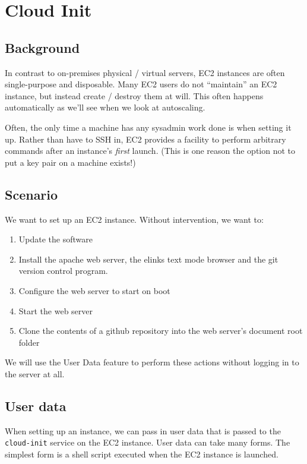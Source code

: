 \chapter{Cloud Init}
\label{ch:cloudinit}

\section{Background}\label{background}

In contrast to on-premises physical / virtual servers, EC2 instances are
often single-purpose and disposable. Many EC2 users do not ``maintain''
an EC2 instance, but instead create / destroy them at will. This often
happens automatically as we'll see when we look at autoscaling.

Often, the only time a machine has any sysadmin work done is when
setting it up. Rather than have to SSH in, EC2 provides a facility to
perform arbitrary commands after an instance's \emph{first} launch.
(This is one reason the option not to put a key pair on a machine
exists!)

\section{Scenario}\label{scenario}

We want to set up an EC2 instance. Without intervention, we want to:

\begin{enumerate}
\def\labelenumi{\arabic{enumi}.}
\item
  Update the software
\item
  Install the apache web server, the elinks text mode browser and the
  git version control program.
\item
  Configure the web server to start on boot
\item
  Start the web server
\item
  Clone the contents of a github repository into the web server's
  document root folder
\end{enumerate}

We will use the User Data feature to perform these actions without
logging in to the server at all.

\section{User data}\label{user-data}

When setting up an instance, we can pass in user data that is passed to
the \texttt{cloud-init} service on the EC2 instance. User data can take
many forms. The simplest form is a shell script executed when the EC2
instance is launched.

